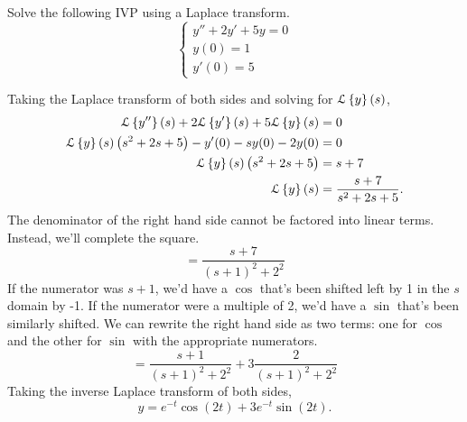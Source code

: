 \begin{example}
	Solve the following IVP using a Laplace transform.
	\begin{equation*}
		\begin{cases}
			y'' + 2y' + 5y = 0 \\
			y(0) = 1 \\
			y'(0) = 5
		\end{cases}
	\end{equation*}
\end{example}
\noindent
Taking the Laplace transform of both sides and solving for $\mathcal{L}\left\{ y \right\}\left(s\right)$,
\begin{align*}
	\mathcal{L}\left\{ y'' \right\}\left(s\right) + 2\mathcal{L}\left\{ y' \right\}\left(s\right) + 5\mathcal{L}\left\{ y \right\}\left(s\right) &= 0 \\
	\mathcal{L}\left\{ y \right\}\left(s\right)\left(s^2 + 2s + 5\right) - y'(0) - sy(0) - 2y(0) &= 0 \\
	\mathcal{L}\left\{ y \right\}\left(s\right)\left(s^2 + 2s + 5\right) &= s + 7 \\
	\mathcal{L}\left\{ y \right\}\left(s\right) &= \frac{s + 7}{s^2 + 2s + 5}.
\end{align*}
The denominator of the right hand side cannot be factored into linear terms.
Instead, we'll complete the square.
\begin{equation*}
	= \frac{s + 7}{(s+1)^2 + 2^2}
\end{equation*}
If the numerator was $s+1$, we'd have a $\cos$ that's been shifted left by 1 in the $s$ domain by -1.
If the numerator were a multiple of 2, we'd have a $\sin$ that's been similarly shifted.
We can rewrite the right hand side as two terms: one for $\cos$ and the other for $\sin$ with the appropriate numerators.
\begin{equation*}
	= \frac{s+1}{(s+1)^2 + 2^2} + 3\frac{2}{(s+1)^2 + 2^2}
\end{equation*}
Taking the inverse Laplace transform of both sides,
\begin{equation*}
	y = e^{-t}\cos{(2t)} + 3e^{-t}\sin{(2t)}.
\end{equation*}

